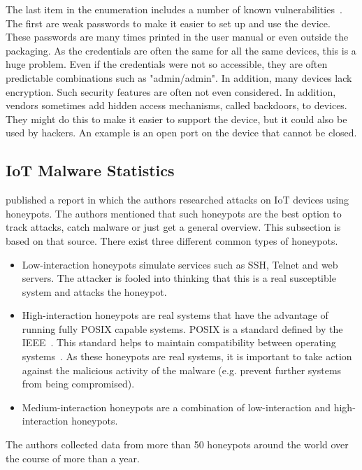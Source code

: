 The last item in the enumeration includes a number of known vulnerabilities~\cite{website:IBMIoT}. The first are weak passwords to make it easier to set up and use the device. These passwords are many times printed in the user manual or even outside the packaging. As the credentials are often the same for all the same devices, this is a huge problem. Even if the credentials were not so accessible, they are often predictable combinations such as "admin/admin". In addition, many devices lack encryption. Such security features are often not even considered. In addition, vendors sometimes add hidden access mechanisms, called backdoors, to devices. They might do this to make it easier to support the device, but it could also be used by hackers. An example is an open port on the device that cannot be closed. 


\subsection{IoT Malware Statistics}
\cite{website:KasperskyAMalwareStory} published a report in which the authors researched attacks on IoT devices using honeypots. The authors mentioned that such honeypots are the best option to track attacks, catch malware or just get a general overview. This subsection is based on that source. There exist three different common types of honeypots. 

\begin{itemize}
    \item Low-interaction honeypots simulate services such as SSH, Telnet and web servers. The attacker is fooled into thinking that this is a real susceptible system and attacks the honeypot.
    \item High-interaction honeypots are real systems that have the advantage of running fully POSIX capable systems. POSIX is a standard defined by the IEEE~\cite{website:IEEEPosix}. This standard helps to maintain compatibility between operating systems~\cite{website:linuxHint}. As these honeypots are real systems, it is important to take action against the malicious activity of the malware (e.g. prevent further systems from being compromised). 
    \item Medium-interaction honeypots are a combination of low-interaction and high-interaction honeypots.  
\end{itemize}

The authors collected data from more than 50 honeypots around the world over the course of more than a year.

